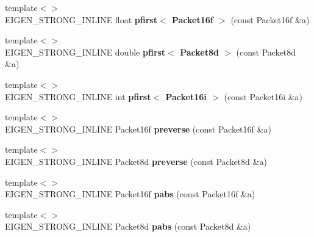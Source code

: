\begin{DoxyCompactItemize}
\item 
\mbox{\label{namespace_eigen_1_1internal_afa51996fe277184be673c156b8b60f40}} 
{\footnotesize template$<$$>$ }\\E\+I\+G\+E\+N\+\_\+\+S\+T\+R\+O\+N\+G\+\_\+\+I\+N\+L\+I\+NE float {\bfseries pfirst$<$ Packet16f $>$} (const Packet16f \&a)
\item 
\mbox{\label{namespace_eigen_1_1internal_ad2dd7f2826c3513187bc2499c954202f}} 
{\footnotesize template$<$$>$ }\\E\+I\+G\+E\+N\+\_\+\+S\+T\+R\+O\+N\+G\+\_\+\+I\+N\+L\+I\+NE double {\bfseries pfirst$<$ Packet8d $>$} (const Packet8d \&a)
\item 
\mbox{\label{namespace_eigen_1_1internal_a4bb6f59edaa2c9b8369c8e61960963e4}} 
{\footnotesize template$<$$>$ }\\E\+I\+G\+E\+N\+\_\+\+S\+T\+R\+O\+N\+G\+\_\+\+I\+N\+L\+I\+NE int {\bfseries pfirst$<$ Packet16i $>$} (const Packet16i \&a)
\item 
\mbox{\label{namespace_eigen_1_1internal_a7539723d25216e31ce77b9e59c220803}} 
{\footnotesize template$<$$>$ }\\E\+I\+G\+E\+N\+\_\+\+S\+T\+R\+O\+N\+G\+\_\+\+I\+N\+L\+I\+NE Packet16f {\bfseries preverse} (const Packet16f \&a)
\item 
\mbox{\label{namespace_eigen_1_1internal_ac54e2f8048a2b8bdedbe3926215a4dc2}} 
{\footnotesize template$<$$>$ }\\E\+I\+G\+E\+N\+\_\+\+S\+T\+R\+O\+N\+G\+\_\+\+I\+N\+L\+I\+NE Packet8d {\bfseries preverse} (const Packet8d \&a)
\item 
\mbox{\label{namespace_eigen_1_1internal_aeecd774c149ce8081af6d30b70c1c4cd}} 
{\footnotesize template$<$$>$ }\\E\+I\+G\+E\+N\+\_\+\+S\+T\+R\+O\+N\+G\+\_\+\+I\+N\+L\+I\+NE Packet16f {\bfseries pabs} (const Packet16f \&a)
\item 
\mbox{\label{namespace_eigen_1_1internal_ad4d30005989d841426dfacf1a8734274}} 
{\footnotesize template$<$$>$ }\\E\+I\+G\+E\+N\+\_\+\+S\+T\+R\+O\+N\+G\+\_\+\+I\+N\+L\+I\+NE Packet8d {\bfseries pabs} (const Packet8d \&a)

\end{DoxyCompactItemize}
